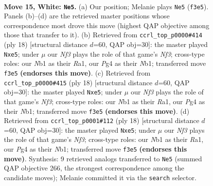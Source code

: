 \documentclass[11pt]{article}
\begin{document}
\clearpage

\begin{figure}[p]\centering
\begin{subfigure}{0.46\textwidth}\centering
\resizebox{\linewidth}{!}{%
\newchessgame
\chessboard[
  setfen={r1bqr1k1/pp2bppp/1nn1p3/8/2Pp2P1/1P3N1B/P2P1PKP/RNBQR3 w - - 4 15},
  showmover=false,
  pgfstyle=straightmove, color=movearrow, markmove={f3-e5}
]}
\caption{}
\end{subfigure}\hfill
\begin{subfigure}{0.46\textwidth}\centering
\resizebox{\linewidth}{!}{%
\newchessgame
\chessboard[
  setfen={r1bq1rk1/2p1bppp/p1n5/1p1np3/8/1BP2N2/PP1P1PPP/RNBQR1K1 w - - 0 10},
  showmover=false,
  pgfstyle=straightmove, color=movearrow, markmove={f3-e5}
]}
\caption{}
\end{subfigure}
\\[4pt]
\begin{subfigure}{0.46\textwidth}\centering
\resizebox{\linewidth}{!}{%
\newchessgame
\chessboard[
  setfen={r1bq1rk1/2p1bppp/p1n5/1p1np3/8/1BP2N2/PP1P1PPP/RNBQR1K1 w - - 0 10},
  showmover=false,
  pgfstyle=straightmove, color=movearrow, markmove={f3-e5}
]}
\caption{}
\end{subfigure}\hfill
\begin{subfigure}{0.46\textwidth}\centering
\resizebox{\linewidth}{!}{%
\newchessgame
\chessboard[
  setfen={r1bq1rk1/2p1bppp/p1n5/1p1np3/8/1BP2N2/PP1P1PPP/RNBQR1K1 w - - 0 10},
  showmover=false,
  pgfstyle=straightmove, color=movearrow, markmove={f3-e5}
]}
\caption{}
\end{subfigure}
\caption{\textbf{Move 15, White: \texttt{Ne5}.} (a) Our position; Melanie plays \texttt{Ne5} (\texttt{f3e5}). Panels (b)--(d) are the retrieved master positions whose correspondence most drove this move (highest QAP objective among those that transfer to it). (b) Retrieved from \texttt{ccrl\_top\_p0000\#414} (ply 18) [structural distance $d$=60, QAP obj=30]: the master played \texttt{Nxe5}; under $\mu$ our \emph{Nf3} plays the role of that game's \emph{Nf3}; cross-type roles: our \emph{N}b1 as their \emph{R}a1, our \emph{P}g4 as their \emph{N}b1; transferred move \texttt{f3e5} \textbf{(endorses this move)}. (c) Retrieved from \texttt{ccrl\_top\_p0000\#415} (ply 18) [structural distance $d$=60, QAP obj=30]: the master played \texttt{Nxe5}; under $\mu$ our \emph{Nf3} plays the role of that game's \emph{Nf3}; cross-type roles: our \emph{N}b1 as their \emph{R}a1, our \emph{P}g4 as their \emph{N}b1; transferred move \texttt{f3e5} \textbf{(endorses this move)}. (d) Retrieved from \texttt{ccrl\_top\_p0001\#112} (ply 18) [structural distance $d$=60, QAP obj=30]: the master played \texttt{Nxe5}; under $\mu$ our \emph{Nf3} plays the role of that game's \emph{Nf3}; cross-type roles: our \emph{N}b1 as their \emph{R}a1, our \emph{P}g4 as their \emph{N}b1; transferred move \texttt{f3e5} \textbf{(endorses this move)}. Synthesis: 9 retrieved analogs transferred to \texttt{Ne5} (summed QAP objective 266, the strongest correspondence among the candidate moves); Melanie committed it via the \texttt{search} selector.}
\label{fig:thought-m28}
\end{figure}
\end{document}
